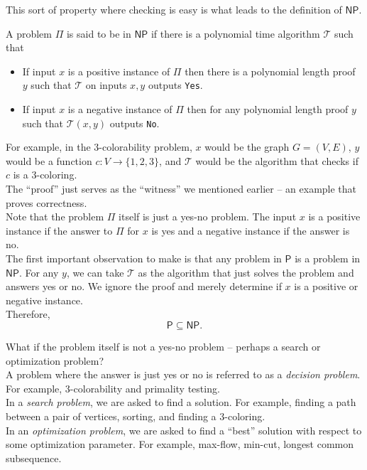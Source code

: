 	This sort of property where checking is easy is what leads to the definition of $\mathsf{NP}$.

	\begin{fdef}
		A problem $\mathsf{\Pi}$ is said to be in $\mathsf{NP}$ if there is a polynomial time algorithm $\mathcal{T}$ such that
		\begin{itemize}
			\item If input $x$ is a positive instance of $\mathsf{\Pi}$ then there is a polynomial length proof $y$ such that $\mathcal{T}$ on inputs $x,y$ outputs \texttt{Yes}.
			\item If input $x$ is a negative instance of $\mathsf{\Pi}$ then for any polynomial length proof $y$ such that $\mathcal{T}(x,y)$ outputs \texttt{No}.
		\end{itemize}
	\end{fdef}

	For example, in the $3$-colorability problem, $x$ would be the graph $G=(V,E)$, $y$ would be a function $c:V\to\{1,2,3\}$, and $\mathcal{T}$ would be the algorithm that checks if $c$ is a $3$-coloring.\\
	The ``proof'' just serves as the ``witness'' we mentioned earlier -- an example that proves correctness.\\

	Note that the problem $\mathsf{\Pi}$ itself is just a yes-no problem. The input $x$ is a positive instance if the answer to $\mathsf{\Pi}$ for $x$ is yes and a negative instance if the answer is no.\\

	The first important observation to make is that any problem in $\mathsf{P}$ is a problem in $\mathsf{NP}$. For any $y$, we can take $\mathcal{T}$ as the algorithm that just solves the problem and answers yes or no. We ignore the proof and merely determine if $x$ is a positive or negative instance.\\
	Therefore,
	\[ \mathsf{P} \subseteq \mathsf{NP}. \]

	What if the problem itself is not a yes-no problem -- perhaps a search or optimization problem?\\
	A problem where the answer is just yes or no is referred to as a \textit{decision problem}. For example, $3$-colorability and primality testing.\\
	In a \textit{search problem}, we are asked to find a solution. For example, finding a path between a pair of vertices, sorting, and finding a $3$-coloring.\\
	In an \textit{optimization problem}, we are asked to find a ``best'' solution with respect to some optimization parameter. For example, max-flow, min-cut, longest common subsequence.\\

